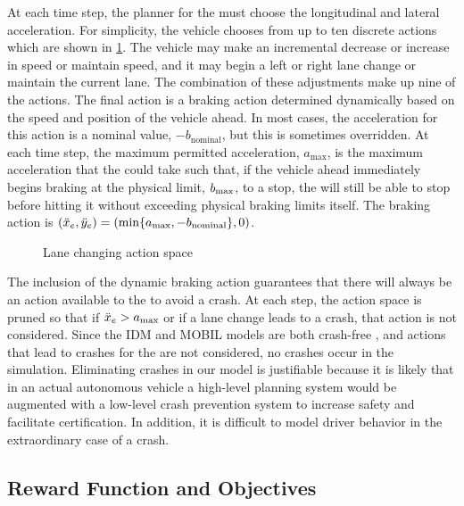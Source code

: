 At each time step, the planner for the \av{} must choose the longitudinal and lateral acceleration.
For simplicity, the vehicle chooses from up to ten discrete actions which are shown in \cref{fig:actions}.
The vehicle may make an incremental decrease or increase in speed or maintain speed, and it may begin a left or right lane change or maintain the current lane.
The combination of these adjustments make up nine of the actions.
The final action is a braking action determined dynamically based on the speed and position of the vehicle ahead.
In most cases, the acceleration for this action is a nominal value, $-b_\text{nominal}$, but this is sometimes overridden.
At each time step, the maximum permitted acceleration, $a_\text{max}$, is the maximum acceleration that the \av{} could take such that, if the  vehicle ahead immediately begins braking at the physical limit, $b_\text{max}$, to a stop, the \av{} will still be able to stop before hitting it without exceeding physical braking limits itself.
The braking action is $({\ddot{x}}_e, {\ddot{y}}_e) = (\min \{a_\text{max}, -b_\text{nominal} \}, 0)$.

\begin{figure}[tb]
    \centering
    
    
    \caption{Lane changing action space}
    \label{fig:actions}
\end{figure}


The inclusion of the dynamic braking action guarantees that there will always be an action available to the \av{} to avoid a crash.
At each step, the action space is pruned so that if ${\ddot{x}}_e > a_\text{max}$ or if a lane change leads to a crash, that action is not considered.
Since the IDM and MOBIL models are both crash-free \cite{kesting2009agents}, and actions that lead to crashes for the \av{} are not considered, no crashes occur in the simulation.
Eliminating crashes in our model is justifiable because it is likely that in an actual autonomous vehicle a high-level planning system would be augmented with a low-level crash prevention system to increase safety and facilitate certification. 
In addition, it is difficult to model driver behavior in the extraordinary case of a crash. 

\subsection{Reward Function and Objectives} \label{sec:reward}

